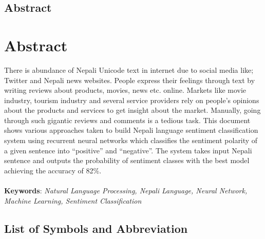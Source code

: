 \section{Abstract}
		\large
			\chapter*{Abstract}
		\normalsize
		\justify
		There is abundance of Nepali Unicode text in internet due to social media like; Twitter
and Nepali news websites. People express their feelings through text by writing reviews
about products, movies, news etc. online. Markets like movie industry, tourism industry
and several service providers rely on people’s opinions about the products and services
to get insight about the market. Manually, going through such gigantic reviews and
comments is a tedious task. This document shows various approaches taken to build
Nepali language sentiment classification system using recurrent neural networks which
classifies the sentiment polarity of a given sentence into “positive” and “negative”. The
system takes input Nepali sentence and outputs the probability of sentiment classes with
the best model achieving the accuracy of 82\%.\\
        \vspace{0.1in}\\
		\textbf{Keywords}: 
		\textit{Natural Language Processing, Nepali Language, Neural Network, Machine Learning, Sentiment Classification}\\

		\break

	    \tableofcontents

		\listoftables
		\break
		\pagebreak

		\listoffigures
		     
		\break
	
	
	
		\Large
			\begingroup
				\let\clearpage\relax
				\section{List of Symbols and Abbreviation}
			\endgroup
		\justify
		\normalsize
		\begin{tabular}{p{1in}p{3in}}
			
		\end{tabular}
		\break
		\pagebreak
		
	